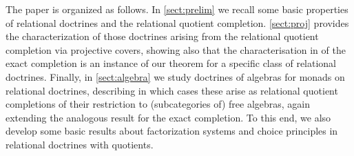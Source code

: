 The paper is organized as follows.
In \cref{sect:prelim} we recall some basic properties of relational doctrines and the relational quotient completion.
\cref{sect:proj} provides the characterization of those doctrines arising from the relational quotient completion via projective covers,  showing also that the characterisation in \cite{CarboniA:regec} of the exact completion is an instance of our theorem for a specific class of relational doctrines. 
Finally, in \cref{sect:algebra} we study doctrines of algebras for monads on relational doctrines, describing in which cases these arise as relational quotient completions of their restriction to (subcategories of) free algebras, again  extending the analogous result for the exact completion. 
To this end, we also develop some basic results about factorization systems and choice principles in relational doctrines with quotients. 


